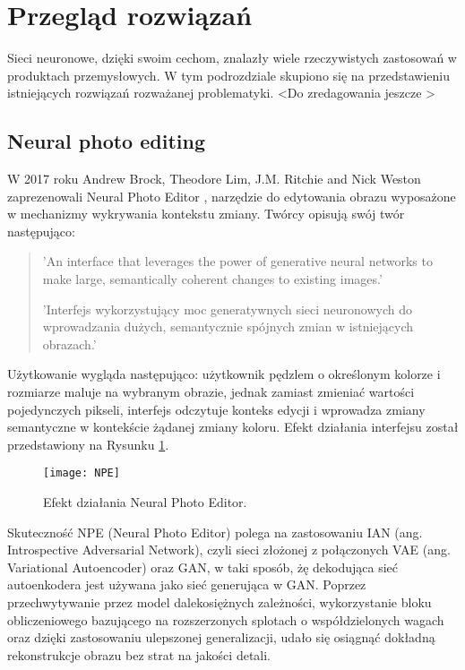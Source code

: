 \section{Przegląd rozwiązań}
  Sieci neuronowe, dzięki swoim cechom, znalazły wiele rzeczywistych zastosowań w produktach
  przemysłowych. W tym podrozdziale skupiono się na przedstawieniu istniejących
  rozwiązań rozważanej problematyki. \textless Do zredagowania jeszcze \textgreater

  \subsection{Neural photo editing}
    W 2017 roku Andrew Brock, Theodore Lim, J.M. Ritchie and Nick Weston
    zaprezenowali Neural Photo Editor \cite{neural_photo_editor}, narzędzie
    do edytowania obrazu wyposażone w mechanizmy wykrywania kontekstu zmiany.
    Twórcy opisują swój twór następująco:

    \begin{quote}
      'An interface that leverages the power of generative neural networks to
      make large, semantically coherent changes to existing images.'

      'Interfejs wykorzystujący moc generatywnych sieci neuronowych do
      wprowadzania dużych, semantycznie spójnych zmian w istniejących obrazach.'
    \end{quote}

    Użytkowanie wygląda następująco: użytkownik pędzlem o określonym kolorze i
    rozmiarze maluje na wybranym obrazie, jednak zamiast zmieniać wartości
    pojedynczych pikseli, interfejs odczytuje konteks edycji i wprowadza zmiany
    semantyczne w kontekście żądanej zmiany koloru. Efekt działania interfejsu
    został przedstawiony na Rysunku \ref{fig:npe}.

    \begin{figure}[h]
      \centering
      \texttt{[image: NPE]}
      \caption{Efekt działania Neural Photo Editor.}
      \label{fig:npe}
    \end{figure}

    Skuteczność NPE (Neural Photo Editor) polega na zastosowaniu IAN
    (ang. Introspective Adversarial Network), czyli sieci złożonej z połączonych
    VAE (ang. Variational Autoencoder) oraz GAN, w taki sposób, żę dekodująca
    sieć autoenkodera jest używana jako sieć generująca w GAN.
    Poprzez przechwytywanie przez model dalekosiężnych zależności, wykorzystanie
    bloku obliczeniowego bazującego na rozszerzonych splotach o
    współdzielonych wagach oraz dzięki zastosowaniu ulepszonej generalizacji,
    udało się osiągnąć dokładną rekonstrukcje obrazu bez strat na jakości detali.


